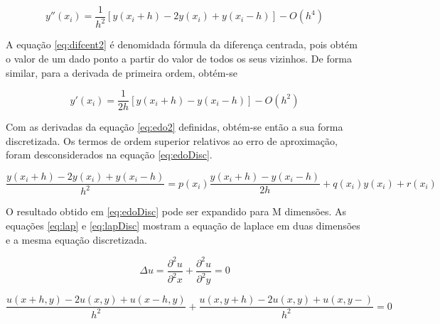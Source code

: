 \begin{equation}
    \label{eq:difcent2}
    y''(x_i) = \frac{1}{h^2}[y(x_i + h) - 2y(x_i) +y(x_i - h)] - O(h^{4})
\end{equation}

A equação \ref{eq:difcent2} é denomidada fórmula da diferença centrada, pois obtém o valor de um dado ponto a partir do valor de todos os seus vizinhos. De forma similar, para a derivada de primeira ordem, obtém-se

\begin{equation}
    \label{eq:difcent}
    y'(x_i) = \frac{1}{2h}[y(x_i + h) - y(x_i - h)] - O(h^{2})
\end{equation}

Com as derivadas da equação \ref{eq:edo2} definidas, obtém-se então a sua forma discretizada. Os termos de ordem superior relativos ao erro de aproximação, foram desconsiderados na equação \ref{eq:edoDisc}.

\begin{equation}
    \label{eq:edoDisc}
   \frac{y(x_i + h) - 2y(x_i) +y(x_i - h)}{h^2} = p(x_i) \frac{y(x_i + h) - y(x_i - h)}{2h} +q(x_i)y(x_i) + r(x_i)
\end{equation}


O resultado obtido em  \ref{eq:edoDisc} pode ser expandido para M dimensões. As equações \ref{eq:lap} e \ref{eq:lapDisc} mostram a equação de laplace em duas dimensões e a mesma equação discretizada.

\begin{equation}
    \label{eq:lap}
    \Delta u = \frac{\partial^2 u}{\partial^2 x} + \frac{\partial^2 u}{\partial^2 y} = 0
\end{equation}

\begin{equation}
    \label{eq:lapDisc}
   \frac{u(x + h, y) - 2u(x, y) +u(x - h, y)}{h^2} +
   \frac{u(x, y + h) - 2u(x, y) +u(x, y - )}{h^2} = 0
\end{equation}